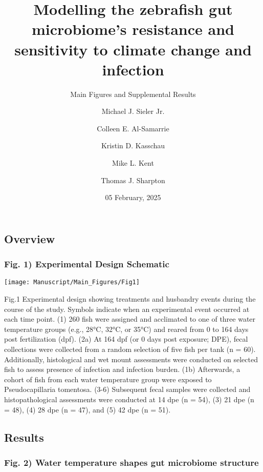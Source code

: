 \documentclass[
]{article}
\title{Modelling the zebrafish gut microbiome's resistance and
sensitivity to climate change and infection}
\subtitle{Main Figures and Supplemental Results}
\author{Michael J. Sieler Jr. \and Colleen E. Al-Samarrie \and Kristin
D. Kasschau \and Mike L. Kent \and Thomas J. Sharpton}
\date{05 February, 2025}
\begin{document}
\maketitle

{
\setcounter{tocdepth}{3}
\tableofcontents
}
\subsection{Overview}\label{overview}

\subsubsection{Fig. 1) Experimental Design
Schematic}\label{fig.-1-experimental-design-schematic}

\texttt{[image: Manuscript/Main\_Figures/Fig1]}

Fig.1 Experimental design showing treatments and husbandry events during
the course of the study. Symbols indicate when an experimental event
occurred at each time point. (1) 260 fish were assigned and acclimated
to one of three water temperature groups (e.g., 28°C, 32°C, or 35°C) and
reared from 0 to 164 days post fertilization (dpf). (2a) At 164 dpf (or
0 days post exposure; DPE), fecal collections were collected from a
random selection of five fish per tank (n = 60). Additionally,
histological and wet mount assessments were conducted on selected fish
to assess presence of infection and infection burden. (1b) Afterwards, a
cohort of fish from each water temperature group were exposed to
Pseudocapillaria tomentosa. (3-6) Subsequent fecal samples were
collected and histopathological assessments were conducted at 14 dpe (n
= 54), (3) 21 dpe (n = 48), (4) 28 dpe (n = 47), and (5) 42 dpe (n =
51).

\subsection{Results}\label{results}

\subsubsection{Fig. 2) Water temperature shapes gut microbiome
structure}\label{fig.-2-water-temperature-shapes-gut-microbiome-structure}
\end{document}
